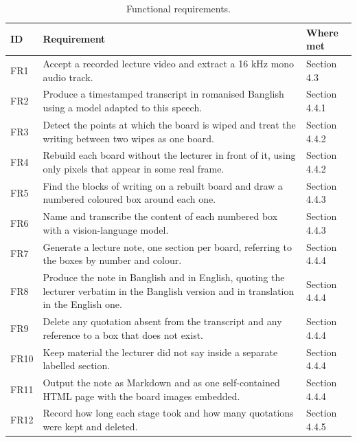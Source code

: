 \begin{table}[htbp]
\centering
\caption{Functional requirements.}
\label{tab:fr}
\small
\begin{tabular}{p{1.0cm}p{9.4cm}p{3.1cm}}
\toprule
ID & Requirement & Where met \\
\midrule
FR1 & Accept a recorded lecture video and extract a 16 kHz mono audio track. &
Section 4.3 \\
FR2 & Produce a timestamped transcript in romanised Banglish using a model adapted to
this speech. & Section 4.4.1 \\
FR3 & Detect the points at which the board is wiped and treat the writing between two
wipes as one board. & Section 4.4.2 \\
FR4 & Rebuild each board without the lecturer in front of it, using only pixels that
appear in some real frame. & Section 4.4.2 \\
FR5 & Find the blocks of writing on a rebuilt board and draw a numbered coloured box
around each one. & Section 4.4.3 \\
FR6 & Name and transcribe the content of each numbered box with a vision-language model.
& Section 4.4.3 \\
FR7 & Generate a lecture note, one section per board, referring to the boxes by number
and colour. & Section 4.4.4 \\
FR8 & Produce the note in Banglish and in English, quoting the lecturer verbatim in the Banglish version and in translation in the English one.
& Section 4.4.4 \\
FR9 & Delete any quotation absent from the transcript and any reference to a box that
does not exist. & Section 4.4.4 \\
FR10 & Keep material the lecturer did not say inside a separate labelled section. &
Section 4.4.4 \\
FR11 & Output the note as Markdown and as one self-contained HTML page with the board
images embedded. & Section 4.4.4 \\
FR12 & Record how long each stage took and how many quotations were kept and deleted. &
Section 4.4.5 \\
\bottomrule
\end{tabular}
\end{table}

